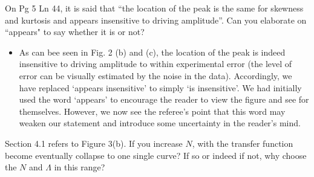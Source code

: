 \documentclass[11pt]{article}
\newcommand{\comment}[1]{{\color{blue} #1}}
\begin{document}
\noindent
\comment{On Pg 5 Ln 44, it is said that ``the location of the peak is the same for skewness and kurtosis and appears insensitive to driving amplitude''. Can you elaborate on ``appears" to say whether it is or not?}

\begin{itemize}
\item As can bee seen in Fig. 2 (b) and (c), the location of the peak is indeed insensitive to driving amplitude to within experimental error (the level of error can be visually estimated by the noise in the data). Accordingly, we have replaced `appears insensitive' to simply `is insensitive'.
We had initially used the word `appears' to encourage the reader to view the figure and see for themselves. However, we now see the referee's point that this word may weaken our statement and introduce some uncertainty in the reader's mind.
\end{itemize}

\noindent
\comment{Section 4.1 refers to Figure 3(b). If you increase $N$, with the transfer function become eventually collapse to one single curve? If so or indeed if not, why choose the $N$ and $\Lambda$ in this range?}
\end{document}
